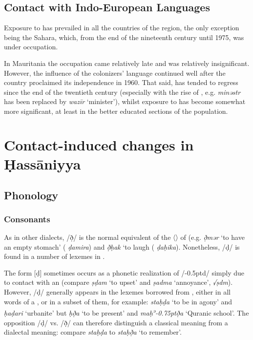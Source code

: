 \documentclass[output=paper]{langsci/langscibook}
\begin{document}
\subsection{Contact with Indo-European Languages} %

Exposure to  has prevailed in all the countries of the region, the only exception being the  Sahara, which, from the end of the nineteenth century until 1975, was under  occupation.

In Mauritania the  occupation came relatively late and was relatively insignificant. However, the influence of the colonizers’ language continued well after the country proclaimed its independence in 1960. That said,  has tended to regress since the end of the twentieth century (especially with the rise of  , e.g. \textit{minəstr} has been replaced by \textit{wazīr} ‘minister’), whilst exposure to  has become somewhat more significant, at least in the better educated sections of the population.

\section{Contact-induced changes in  Ḥassāniyya} %

\subsection{Phonology} %

\subsubsection{Consonants} %
As in other  dialects, /ð̣/ is the normal equivalent of the 〈〉 of   (e.g. \textit{ð̣mər} ‘to have an empty stomach’ ( \textit{ḍamira}) and \textit{ð̣ḥak} ‘to laugh ( \textit{ḍaḥika}). Nonetheless, /ḍ/ is found in a number of lexemes in . 

The form [ḍ] sometimes occurs as a phonetic realization of /\kern -0.5ptd/ simply due to contact with an  (compare \textit{ṣḍam} ‘to upset’ and \textit{ṣadma} ‘annoyance’,  \textit{√ṣdm}). However, /ḍ/ generally appears in the lexemes borrowed from  , either in all words of a , or in a subset of them, for example: \textit{staḥḍa{\R}} ‘to be in agony’ and \textit{ḥaḍari} ‘urbanite’ but \textit{ḥð̣a{\R}} ‘to be present’ and \textit{maḥ\textsuperscript{ə}\kern -0.75ptð̣{\R}a} ‘Quranic school’. The opposition /ḍ/ vs. /ð̣/ can therefore distinguish a classical meaning from a dialectal meaning: compare \textit{staḥḍa{\R}} to \textit{staḥð̣a{\R}} ‘to remember’.
\end{document}
